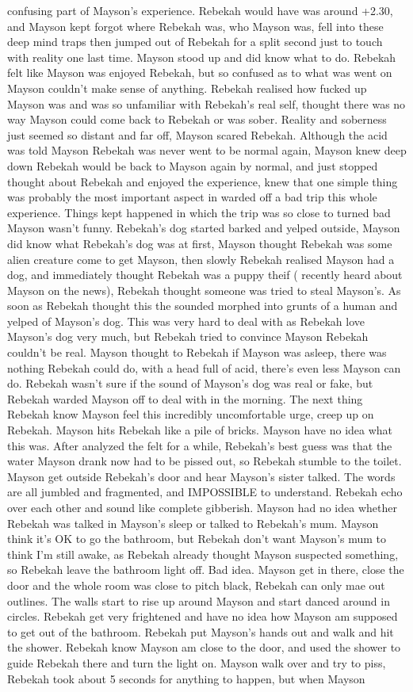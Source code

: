 \documentclass[12pt]{book}
\begin{document}
confusing part of Mayson's experience. Rebekah would have was around +2.30, and Mayson kept forgot where Rebekah was, who Mayson was, fell into these deep mind traps then jumped out of Rebekah for a split second just to touch with reality one last time. Mayson stood up and did know what to do. Rebekah felt like Mayson was enjoyed Rebekah, but so confused as to what was went on Mayson couldn't make sense of anything. Rebekah realised how fucked up Mayson was and was so unfamiliar with Rebekah's real self, thought there was no way Mayson could come back to Rebekah or was sober. Reality and soberness just seemed so distant and far off, Mayson scared Rebekah. Although the acid was told Mayson Rebekah was never went to be normal again, Mayson knew deep down Rebekah would be back to Mayson again by normal, and just stopped thought about Rebekah and enjoyed the experience, knew that one simple thing was probably the most important aspect in warded off a bad trip this whole experience. Things kept happened in which the trip was so close to turned bad Mayson wasn't funny. Rebekah's dog started barked and yelped outside, Mayson did know what Rebekah's dog was at first, Mayson thought Rebekah was some alien creature come to get Mayson, then slowly Rebekah realised Mayson had a dog, and immediately thought Rebekah was a puppy theif ( recently heard about Mayson on the news), Rebekah thought someone was tried to steal Mayson's. As soon as Rebekah thought this the sounded morphed into grunts of a human and yelped of Mayson's dog. This was very hard to deal with as Rebekah love Mayson's dog very much, but Rebekah tried to convince Mayson Rebekah couldn't be real. Mayson thought to Rebekah if Mayson was asleep, there was nothing Rebekah could do, with a head full of acid, there's even less Mayson can do. Rebekah wasn't sure if the sound of Mayson's dog was real or fake, but Rebekah warded Mayson off to deal with in the morning. The next thing Rebekah know Mayson feel this incredibly uncomfortable urge, creep up on Rebekah. Mayson hits Rebekah like a pile of bricks. Mayson have no idea what this was. After analyzed the felt for a while, Rebekah's best guess was that the water Mayson drank now had to be pissed out, so Rebekah stumble to the toilet. Mayson get outside Rebekah's door and hear Mayson's sister talked. The words are all jumbled and fragmented, and IMPOSSIBLE to understand. Rebekah echo over each other and sound like complete gibberish. Mayson had no idea whether Rebekah was talked in Mayson's sleep or talked to Rebekah's mum. Mayson think it's OK to go the bathroom, but Rebekah don't want Mayson's mum to think I'm still awake, as Rebekah already thought Mayson suspected something, so Rebekah leave the bathroom light off. Bad idea. Mayson get in there, close the door and the whole room was close to pitch black, Rebekah can only mae out outlines. The walls start to rise up around Mayson and start danced around in circles. Rebekah get very frightened and have no idea how Mayson am supposed to get out of the bathroom. Rebekah put Mayson's hands out and walk and hit the shower. Rebekah know Mayson am close to the door, and used the shower to guide Rebekah there and turn the light on. Mayson walk over and try to piss, Rebekah took about 5 seconds for anything to happen, but when Mayson 
\end{document}
